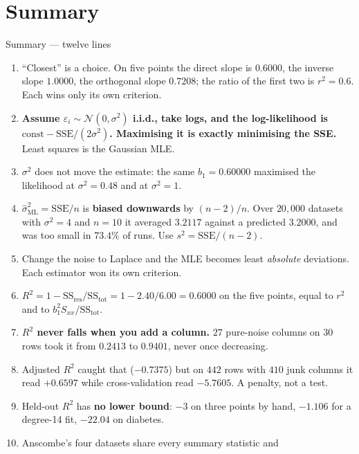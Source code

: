 \documentclass[aspectratio=169]{beamer}
\begin{document}
\section{Summary}
\label{sec:summary}

\begin{frame}[shrink=16]{Summary --- twelve lines}
  \begin{enumerate}\small
    \item ``Closest'' is a choice. On five points the direct slope is
      $0.6000$, the inverse slope $1.0000$, the orthogonal slope $0.7208$; the
      ratio of the first two is $r^2 = 0.6$. Each wins only its own criterion.
    \item \textbf{Assume $\varepsilon_i \sim \mathcal{N}(0,\sigma^2)$ i.i.d.,
      take logs, and the log-likelihood is
      $\text{const} - \mathrm{SSE}/(2\sigma^2)$. Maximising it is exactly
      minimising the SSE.} Least squares is the Gaussian MLE.
    \item $\sigma^2$ does not move the estimate: the same $b_1 = 0.60000$
      maximised the likelihood at $\sigma^2 = 0.48$ and at $\sigma^2 = 1$.
    \item $\hat\sigma^2_{\mathrm{ML}} = \mathrm{SSE}/n$ is \textbf{biased
      downwards} by $(n-2)/n$. Over $20{,}000$ datasets with $\sigma^2 = 4$ and
      $n = 10$ it averaged $3.2117$ against a predicted $3.2000$, and was too
      small in $73.4\%$ of runs. Use $s^2 = \mathrm{SSE}/(n-2)$.
    \item Change the noise to Laplace and the MLE becomes least
      \emph{absolute} deviations. Each estimator won its own criterion.
    \item $R^2 = 1 - \mathrm{SS_{res}}/\mathrm{SS_{tot}} = 1 - 2.40/6.00 =
      0.6000$ on the five points, equal to $r^2$ and to $b_1^2S_{xx}/
      \mathrm{SS_{tot}}$.
    \item \textbf{$R^2$ never falls when you add a column.} $27$ pure-noise
      columns on $30$ rows took it from $0.2413$ to $0.9401$, never once
      decreasing.
    \item Adjusted $R^2$ caught that ($-0.7375$) but on $442$ rows with $410$
      junk columns it read $+0.6597$ while cross-validation read $-5.7605$.
      A penalty, not a test.
    \item Held-out $R^2$ has \textbf{no lower bound}: $-3$ on three points by
      hand, $-1.106$ for a degree-14 fit, $-22.04$ on diabetes.
    \item Anscombe's four datasets share every summary statistic and

\end{enumerate}
\end{frame}
\end{document}
